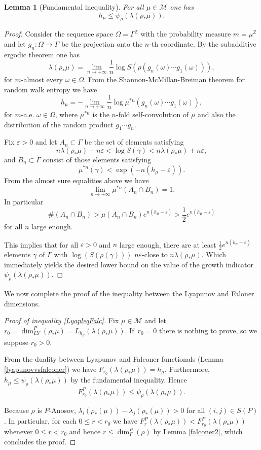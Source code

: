 \documentclass[10pt,a4paper]{amsart}
\let\epsilon\varepsilon
\newtheorem{lemma}[theorem]{Lemma}
\newcommand{\Z}{\mathbb{Z}}
\let\e\varepsilon
\let\G\Gamma
\let\g\gamma
\let\la\lambda
\begin{document}
\begin{lemma}[Fundamental inequality]
For all \(\mu \in \mathcal{M}\) one has
\[
h_\mu \le \psi_{\rho}(\lambda(\rho_*\mu)).
\]
\end{lemma}
\begin{proof}
Consider the sequence space \(\Omega = \Gamma^{\Z}\) with the probability measure \(m = \mu^\Z\) and let \(g_n:\Omega \to \Gamma\) be the projection onto the \(n\)-th coordinate.
By the subadditive ergodic theorem \cite{Ose68} one has
\[
\lambda(\rho_*\mu) = \lim_{n \to +\infty}\frac{1}{n}\log S(\rho(g_n(\omega)\cdots g_1(\omega))),
\]
for \(m\)-almost every \(\omega \in \Omega\).
From the Shannon-McMillan-Breiman theorem for random walk entropy \cite{KV83} we have
\[
h_\mu = -\lim_{n \to +\infty}\frac{1}{n}\log \mu^{\ast n}(g_n(\omega)\cdots g_1(\omega)),
\]
for \(m\)-a.e. \(\omega \in \Omega\), where \(\mu^{\ast n}\) is the \(n\)-fold self-convolution of \(\mu\) and also the distribution of the random product \(g_1 \cdots g_n\).

Fix \(\epsilon > 0\) and let \(A_n \subset \Gamma\) be the set of elements satisfying
\[
n\lambda(\rho_*\mu) - n\epsilon < \log S(\gamma) < n\lambda(\rho_*\mu) + n\epsilon,
\]
and \(B_n \subset \Gamma\) consist of those elements satisfying
\[
\mu^{\ast n}(\gamma) < \exp(-n(h_\mu - \epsilon)).
\]
From the almost sure equalities above we have
\[
\lim_{n \to +\infty}\mu^{\ast n}(A_n \cap B_n) = 1.
\]
In particular
\[
\# (A_n \cap B_n) > \mu(A_n \cap B_n)e^{n(h_\mu - \epsilon)} > \frac{1}{2}e^{n(h_\mu - \epsilon)}
\]
for all \(n\) large enough.

This implies that for all \(\epsilon >0\) and \(n\) large enough, there are at least \(\frac{1}{2}e^{n(h_\mu -\e)}\) elements \(\g\) of \(\G\) with \(\log(S(\rho(\gamma)))\) \(n \e\)-close to \(n\lambda (\rho_*\mu)\). Which immediately yields the desired lower bound on the value of the growth indicator \(\psi_{\rho}(\lambda(\rho_*\mu))\).
\end{proof}

We now complete the proof of the inequality between the Lyapunov and Faloner dimensions.

\begin{proof}[Proof of inequality \eqref{LyapleqFalc}]
Fix \(\mu \!\in\! \mathcal{M}\) and let \(r_0 \!=\! \dim_{LY}^P(\rho_\ast \mu) \!=\! L_{h_\mu}(\lambda(\rho_*\mu))\). If~\hbox{\(r_0 = 0\)} there is nothing to prove, so we suppose \(r_0 > 0\).

From the duality between Lyapunov and Falconer functionals (Lemma \ref{lyapunovvsfalconer}) we have
\(F_{r_0}(\lambda(\rho_*\mu)) = h_\mu\). Furthermore, \(h_\mu \le \psi_{\rho}(\lambda(\rho_{*}\mu)) \) by the fundamental inequality. Hence
\[
F_{r_0}^P(\la(\rho_*\mu)) \le \psi_\rho (\la(\rho_*\mu)).
\]

Because \(\rho\) is \(P\)-Anosov, \(\lambda_i(\rho_*(\mu)) - \lambda_j(\rho_*(\mu)) > 0\) for all \((i,j) \in S(P)\). In particular, for each \(0\le r < r_0\) we have \(F_{r}^P(\la(\rho_*\mu)) < F_{r_0}^P(\la(\rho_*\mu))\) whenever \(0 \le r < r_0\) and hence
\(r \le \dim_F^P(\rho) \) by Lemma \ref{falconer2}, which concludes the proof.
\end{proof}
\end{document}
